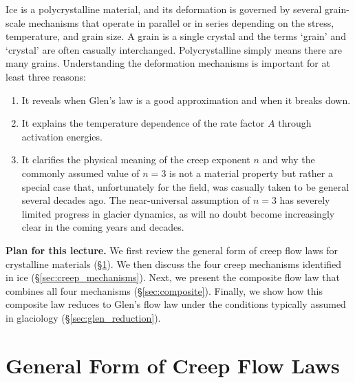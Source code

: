\documentclass[11pt]{article}
\begin{document}
\noindent Ice is a polycrystalline material, and its deformation is governed by several grain-scale mechanisms that operate in parallel or in series depending on the stress, temperature, and grain size.  A grain is a single crystal and the terms `grain' and `crystal' are often casually interchanged. Polycrystalline simply means there are many grains. Understanding the deformation mechanisms is important for at least three reasons:
\begin{enumerate}
  \item It reveals when Glen's law is a good approximation and when it breaks down.
  \item It explains the temperature dependence of the rate factor $A$ through activation energies.
  \item It clarifies the physical meaning of the creep exponent $n$ and why the commonly assumed value of $n = 3$ is not a material property but rather a special case that, unfortunately for the field, was casually taken to be general several decades ago. The near-universal assumption of $n=3$ has severely limited progress in glacier dynamics, as will no doubt become increasingly clear in the coming years and decades. 
\end{enumerate}

\medskip
\noindent\textbf{Plan for this lecture.}  We first review the general form of creep flow laws for crystalline materials (\S\ref{sec:general_form}).  We then discuss the four creep mechanisms identified in ice (\S\ref{sec:creep_mechanisms}).  Next, we present the composite flow law that combines all four mechanisms (\S\ref{sec:composite}).  Finally, we show how this composite law reduces to Glen's flow law under the conditions typically assumed in glaciology (\S\ref{sec:glen_reduction}).

\section{General Form of Creep Flow Laws}
\label{sec:general_form}
\end{document}
